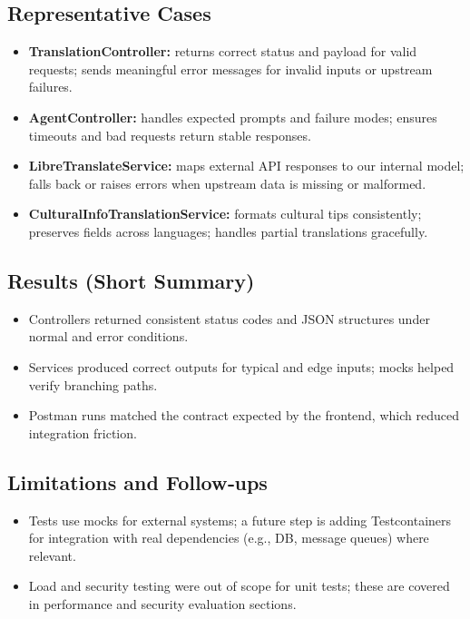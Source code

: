 \subsection{Representative Cases}
\begin{itemize}
    \item \textbf{TranslationController:} returns correct status and payload for valid requests; sends meaningful error messages for invalid inputs or upstream failures.
    \item \textbf{AgentController:} handles expected prompts and failure modes; ensures timeouts and bad requests return stable responses.
    \item \textbf{LibreTranslateService:} maps external API responses to our internal model; falls back or raises errors when upstream data is missing or malformed.
    \item \textbf{CulturalInfoTranslationService:} formats cultural tips consistently; preserves fields across languages; handles partial translations gracefully.
\end{itemize}

\subsection{Results (Short Summary)}
\begin{itemize}
    \item Controllers returned consistent status codes and JSON structures under normal and error conditions.
    \item Services produced correct outputs for typical and edge inputs; mocks helped verify branching paths.
    \item Postman runs matched the contract expected by the frontend, which reduced integration friction.
\end{itemize}

\subsection{Limitations and Follow‑ups}
\begin{itemize}
    \item Tests use mocks for external systems; a future step is adding Testcontainers for integration with real dependencies (e.g., DB, message queues) where relevant.
    \item Load and security testing were out of scope for unit tests; these are covered in performance and security evaluation sections.
\end{itemize}


